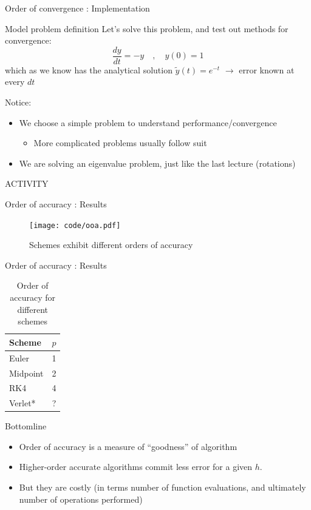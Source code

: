 \documentclass[presentation]{beamer}
\begin{document}
\begin{frame}[label={sec:org202493f}]{Order of convergence : Implementation}
\begin{block}{Model problem definition}
Let's solve this problem, and test out methods for convergence:
\[ \frac{dy}{dt} = -y \quad,\quad  y(0) = 1 \]
which as we know has the analytical solution \(\tilde{y}(t) = e^{-t}\) \(\rightarrow\)
error known at every \(dt\)

Notice:
\begin{itemize}
\item We choose a simple problem to understand performance/convergence
\begin{itemize}
\item More complicated problems usually follow suit
\end{itemize}
\item We are solving an eigenvalue problem, just like the last lecture (rotations)
\end{itemize}

\alert{ACTIVITY}
\end{block}
\end{frame}
\begin{frame}[label={sec:org86ee0a6}]{Order of accuracy : Results}
\begin{figure}[htbp]
\centering
\texttt{[image: code/ooa.pdf]}
\caption{Schemes exhibit different orders of accuracy}
\end{figure}
\end{frame}
\begin{frame}[label={sec:org51d59e0}]{Order of accuracy : Results}
\begin{table}[htbp]
\caption{\label{tab_sym_snake_params}
Order of accuracy for different schemes}
\centering
\begin{tabular}{lr}
\toprule
Scheme & \(p\)\\
\midrule
Euler & 1\\
Midpoint & 2\\
RK4 & 4\\
Verlet* & ?\\
\bottomrule
\end{tabular}
\end{table}
\end{frame}
\begin{frame}[label={sec:org163ab7a}]{Bottomline}
\begin{itemize}
\item Order of accuracy is a measure of ``goodness'' of algorithm
\item Higher-order accurate algorithms commit less error for a given \(h\).
\item But they are costly (in terms number of function evaluations, and
ultimately number of operations performed)
\end{itemize}
\end{frame}
\end{document}
